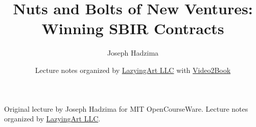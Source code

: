 \documentclass[11pt,oneside]{book}
\begin{document}
\frontmatter
\title{Nuts and Bolts of New Ventures: Winning SBIR Contracts}
\author{Joseph Hadzima}
\date{Lecture notes organized by \href{https://lazying.art}{LazyingArt LLC} with \href{https://github.com/lachlanchen/Video2Book}{Video2Book}}
\maketitle
\begin{center}
\small Original lecture by Joseph Hadzima for MIT OpenCourseWare. Lecture notes organized by \href{https://lazying.art}{LazyingArt LLC}.
\end{center}
\clearpage
\mainmatter

\end{document}

